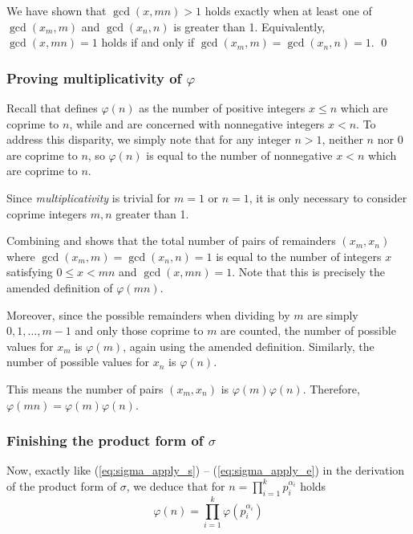 \documentclass[a4paper, 12pt]{article}
\theoremstyle{definition}
\begin{document}
We have shown that $\gcd(x,mn)>1$ holds exactly when at least one of $\gcd(x_m, m)$ and $\gcd(x_n, n)$ is greater than 1.
Equivalently, $\gcd(x,mn)=1$ holds if and only if $\gcd(x_m, m) = \gcd(x_n, n) = 1$.
\qed\vspace{1em}

\subsubsection*{Proving multiplicativity of $\varphi$}
Recall that \textbf{} defines $\varphi(n)$ as the number of positive integers $x\leq n$
which are coprime to $n$, while \textbf{} and \textbf{} are concerned
with nonnegative integers $x < n$.
To address this disparity, we simply note that
for any integer $n>1$, neither $n$ nor $0$ are coprime to $n$, so $\varphi(n)$ is
equal to the number of nonnegative $x < n$ which are coprime to $n$.

Since \textit{multiplicativity} is trivial for $m=1$ or $n=1$,
it is only necessary to consider coprime integers $m, n$ greater than 1.

Combining \textbf{} and \textbf{} shows that
the total number of pairs of remainders $(x_m, x_n)$ where $\gcd(x_m, m) = \gcd(x_n, n) = 1$
is equal to the number of integers $x$ satisfying $0 \leq x < mn$ and $\gcd(x, mn)=1$.
Note that this is precisely the amended definition of $\varphi(mn)$.

Moreover, since the possible remainders when dividing by $m$ are simply
${0, 1, \dots, m-1}$ and only those coprime to $m$ are counted, the number of possible
values for $x_m$ is $\varphi(m)$, again using the amended definition.
Similarly, the number of possible values for $x_n$ is $\varphi(n)$.

This means the number of pairs $(x_m, x_n)$ is $\varphi(m)\varphi(n)$.
Therefore, $\varphi(mn)=\varphi(m)\varphi(n)$.

\subsubsection*{Finishing the product form of $\sigma$}
Now, exactly like (\ref{eq:sigma_apply_s}) -- (\ref{eq:sigma_apply_e}) in the derivation of the product form of $\sigma$,
we deduce that for $n = \prod_{i=1}^{k}p_i^{\alpha_i}$ holds
\begin{equation}
  \varphi(n)=\prod_{i=1}^{k}\varphi(p_i^{\alpha_i})\label{eq:totient_apply_e}
\end{equation}
\end{document}
